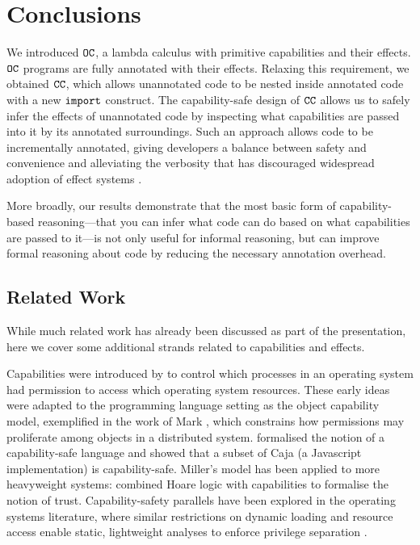 \section{Conclusions}

We introduced $\mathtt{OC}$, a lambda calculus with primitive capabilities and their effects. $\mathtt{OC}$ programs are fully annotated with their effects. Relaxing this requirement, we obtained $\mathtt{CC}$, which allows unannotated code to be nested inside annotated code with a new $\mathtt{import}$ construct. The capability-safe design of $\mathtt{CC}$ allows us to safely infer the effects of unannotated code by inspecting what capabilities are passed into it by its annotated surroundings. Such an approach allows code to be incrementally annotated, giving developers a balance between safety and convenience and alleviating the verbosity that has discouraged widespread adoption of effect systems \cite{rytz12}.

More broadly, our results demonstrate that the most basic form of capability-based reasoning---that you can infer what code can do based on what capabilities are passed to it---is not only useful for informal reasoning, but can improve formal reasoning about code by reducing the necessary annotation overhead.

\subsection{Related Work}

While much related work has already been discussed as part of the presentation, here we cover some additional strands related to capabilities and effects.

Capabilities were introduced by \cite{dennis66} to control which processes in an operating system had permission to access which operating system resources.
These early ideas were adapted to the programming language setting as the object capability model, exemplified in the work of Mark \cite{miller06}, which constrains how permissions may proliferate among objects in a distributed system.
\cite{maffeis10} formalised the notion of a capability-safe language and showed that a subset of Caja (a Javascript implementation) is capability-safe.
Miller's model has been applied to more heavyweight systems: \cite{drossopoulou07} combined Hoare logic with capabilities to formalise the notion of trust. Capability-safety parallels have been explored in the operating systems literature, where similar restrictions on dynamic loading and resource access \cite{hunt07} enable static, lightweight analyses to enforce privilege separation \cite{madhavapeddy13}.

